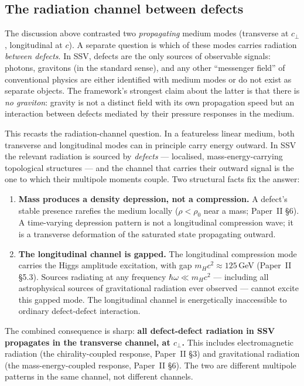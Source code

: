 \documentclass[11pt,a4paper]{article}
\begin{document}
\subsection{The radiation channel between defects}
\label{sec:radiation_channel}

The discussion above contrasted two \emph{propagating} medium modes
(transverse at $c_\perp$, longitudinal at $c$).  A separate question is
which of these modes carries radiation \emph{between defects}.  In
SSV, defects are the only sources of observable signals: photons,
gravitons (in the standard sense), and any other ``messenger field''
of conventional physics are either identified with medium modes or do
not exist as separate objects.  The framework's strongest claim about
the latter is that there is \emph{no graviton}: gravity is not a
distinct field with its own propagation speed but an interaction
between defects mediated by their pressure responses in the medium.

This recasts the radiation-channel question.  In a featureless
linear medium, both transverse and longitudinal modes can in principle
carry energy outward.  In SSV the relevant radiation is sourced by
\emph{defects} --- localised, mass-energy-carrying topological
structures --- and the channel that carries their outward signal is the
one to which their multipole moments couple.  Two structural facts
fix the answer:

\begin{enumerate}
\item \textbf{Mass produces a density depression, not a compression.}
      A defect's stable presence rarefies the medium locally
      ($\rho < \rho_0$ near a mass; Paper~II \S6).  A time-varying
      depression pattern is not a longitudinal compression wave; it is
      a transverse deformation of the saturated state propagating
      outward.
\item \textbf{The longitudinal channel is gapped.}  The longitudinal
      compression mode carries the Higgs amplitude excitation, with
      gap $m_H c^2 \approx 125$\,GeV (Paper~II \S5.3).  Sources
      radiating at any frequency $\hbar\omega \ll m_H c^2$ ---
      including all astrophysical sources of gravitational radiation
      ever observed --- cannot excite this gapped mode.  The
      longitudinal channel is energetically inaccessible to ordinary
      defect-defect interaction.
\end{enumerate}

The combined consequence is sharp: \textbf{all defect-defect radiation
in SSV propagates in the transverse channel, at $c_\perp$.}  This
includes electromagnetic radiation (the chirality-coupled response,
Paper~II \S3) and gravitational radiation (the mass-energy-coupled
response, Paper~II \S6).  The two are different multipole patterns
in the same channel, not different channels.
\end{document}
